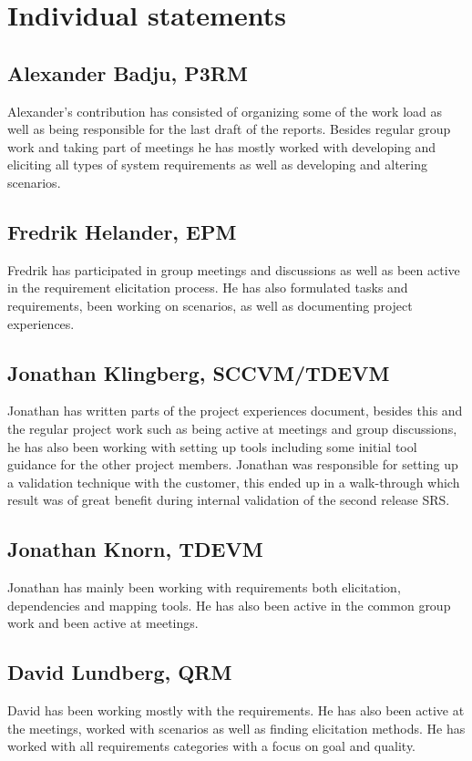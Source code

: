 \documentclass[10pt]{article}
\begin{document}

\section{Individual statements}
\noindent
\subsection{Alexander Badju, P3RM}
Alexander's contribution has consisted of organizing some of the work load as well as being responsible for the last draft of the reports. Besides regular group work and taking part of meetings he has mostly worked with developing and eliciting all types of system requirements as well as developing and altering scenarios. 
\subsection{Fredrik Helander, EPM}
Fredrik has participated in group meetings and discussions as well as been active in the requirement elicitation process. He has also formulated tasks and requirements, been working on scenarios, as well as documenting project experiences.
\subsection{Jonathan Klingberg, SCCVM/TDEVM}
Jonathan has written parts of the project experiences document, besides this and the regular project work such as being active at meetings and group discussions, he has also been working with setting up tools including some initial tool guidance for the other project members.
Jonathan was responsible for setting up a validation technique with the customer, this ended up in a walk-through which result was of great benefit during internal validation of the second release SRS.
\subsection{Jonathan Knorn, TDEVM}
Jonathan has mainly been working with requirements both elicitation, dependencies and mapping tools. 
He has also been active in the common group work and been active at meetings.
\subsection{David Lundberg, QRM}
David has been working mostly with the requirements. He has also been active at the meetings, worked with scenarios as well as finding elicitation methods. He has worked with all requirements categories with a focus on goal and quality. 
\end{document}
